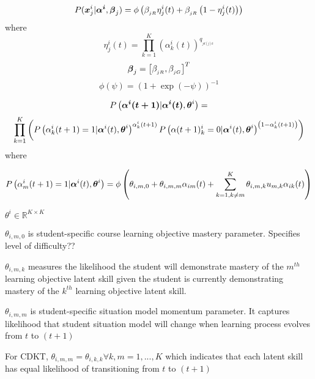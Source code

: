\begin{definition}

\begin{equation}
    P(\boldsymbol{x}^{i}_{j} | \boldsymbol{\alpha^{i}}, \boldsymbol{\beta}_{j}) = \phi \left (  \beta_{_{jR}} \eta^{i}_{j}(t) + \beta_{_{jR}} \left ( 1 - \eta^{i}_{j}(t) \right ) \right )
\end{equation}
where 
\begin{equation*}
    \eta^{i}_{j}(t) = \prod_{k=1}^{K} \left ( \alpha^{i}_{k} (t) \right )^{q_{_{jd(j)k}}}
\end{equation*}
\begin{equation*}
    \boldsymbol{\beta}_{j} = \left[ \beta_{_{jR}}, \beta_{_{jG}} \right]^{T}
\end{equation*}
\begin{equation*}
    \phi(\psi) = \left ( 1 + \exp(-\psi) \right )^{-1}
\end{equation*}
\end{definition}

\begin{definition}
\begin{equation*}
    P \left ( \boldsymbol{\alpha^{i} (t+1)} | \boldsymbol{\alpha^{i} (t)}, \boldsymbol{\theta}^{i}  \right ) =
\end{equation*}
\begin{equation}
    \prod^{K}_{k=1} 
    \left ( P \left ( \alpha^{i}_{k} (t+1) = 1 | \boldsymbol{\alpha}^{i} (t), \boldsymbol{\theta}^{i}  \right )^{\alpha^{i}_{k}(t+1)}
    P \left ( \alpha (t+1)^{i}_{k} = 0 | \boldsymbol{\alpha}^{i} (t), \boldsymbol{\theta}^{i}  \right )^{ \left(1 - \alpha^{i}_{k}(t+1)\right )} 
    \right )
\end{equation}
where 

\begin{equation*}
     P \left ( \alpha^{i}_{m} (t+1) = 1 | \boldsymbol{\alpha}^{i} (t), \boldsymbol{\theta}^{i}  \right ) =
     \phi\left ( \theta_{i,m,0} + \theta_{i,m,m}\alpha_{im}(t) + \sum_{k=1,k \neq m}^{K} \theta_{i,m,k}u_{m,k}\alpha_{ik}(t) \right )
\end{equation*}

    $\theta^{i} \in \mathbb{R}^{K\times K} $

    $\theta_{i,m,0}$ is student-specific course learning objective mastery parameter. Specifies level of difficulty??

    $\theta_{i,m,k}$ measures the likelihood the student will demonstrate mastery of the $m^{th}$ learning objective latent skill given the student is currently demonstrating mastery of the $k^{th}$ learning objective latent skill.
    
    $\theta_{i,m,m}$ is student-specific situation model momentum parameter. It captures likelihood that student situation model will change when learning process evolves from $t$ to $(t+1)$
    
    For CDKT, $\theta_{i,m,m} = \theta_{i,k,k} \forall k,m = {1,...,K}$ which indicates that each latent skill has equal likelihood of transitioning from $t$ to $(t+1)$
\end{definition}








